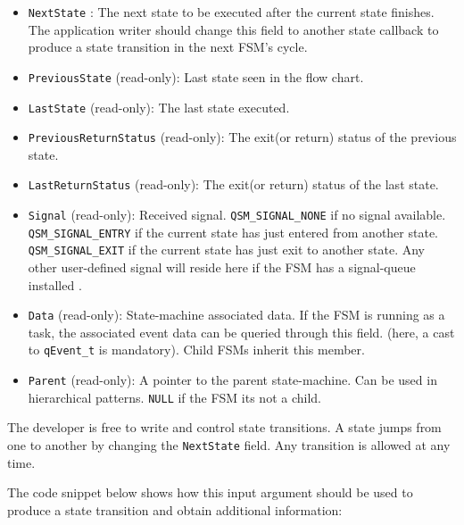\begin{itemize}
    \item \lstinline{NextState} : The next state to be executed after the current state finishes. The application writer should change this field to another state callback to produce a state transition in the next FSM's cycle.
    \item \lstinline{PreviousState} (read-only):  Last state seen in the flow chart.
    \item \lstinline{LastState} (read-only):  The last state executed.
    \item \lstinline{PreviousReturnStatus} (read-only): The exit(or return) status of the previous state.
    \item \lstinline{LastReturnStatus} (read-only): The exit(or return) status of the last state.
    \item \lstinline{Signal} (read-only): Received signal. \lstinline{QSM_SIGNAL_NONE} if no signal available. \lstinline{QSM_SIGNAL_ENTRY} if the current state has just entered from another state. \lstinline{QSM_SIGNAL_EXIT} if the current state has just exit to another state. Any other user-defined signal will reside here if the FSM has a signal-queue installed .
    \item \lstinline{Data} (read-only): State-machine associated data. If the FSM is running as a task, the associated event data can be queried through this field. (here, a cast to \lstinline{qEvent_t} is mandatory). Child FSMs inherit this member.
    \item \lstinline{Parent} (read-only): A pointer to the parent state-machine. Can be used in hierarchical  patterns. \lstinline{NULL} if the FSM its not a child.
\end{itemize}

The developer is free to write and control state transitions. A state jumps from one to another by changing the \lstinline{NextState} field. Any transition is allowed at any time.

The code snippet below shows how this input argument should be used to produce a state transition and obtain additional information: \\

